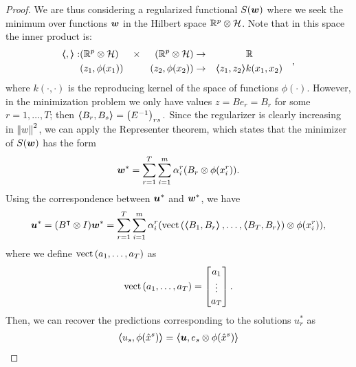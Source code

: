 \begin{proof}
    We are thus considering a regularized functional $S(\bm{w})$ where we seek the minimum over functions $\bm{w}$ in the Hilbert space $\mathbb{R}^p \otimes \mathcal{H}$. Note that in this space the inner product is:
    \begin{equation}
        \nonumber
        \begin{aligned}
            \bm{\left\langle} ,  \bm{\right\rangle}: & (\mathbb{R}^p \otimes \mathcal{H}) & \times &  & (\mathbb{R}^p \otimes \mathcal{H}) & \to &                 & \mathbb{R}      & \\
                       & (z_1, \phi(x_1))                 &        &  & (z_2, \phi(x_2))                 & \to & \bm{\left\langle} z_1, z_2 \bm{\right\rangle} & k(x_1, x_2) &
        \end{aligned},
    \end{equation}
    where $k(\cdot, \cdot)$ is the reproducing kernel of the space of functions $\phi(\cdot)$.
    However, in the minimization problem we only have values $z = B e_r = B_r$ for some $r=1, \ldots, T$; then $\bm{\left\langle} B_r, B_s \bm{\right\rangle} = \left(E^{-1}\right)_{rs}.$
    Since the regularizer is clearly increasing in $\left\lVert w\right\rVert^2$, we can apply the Representer theorem, which states that the minimizer of $S(\bm{w})$ has the form
    \begin{equation}
        \nonumber
        {\bm{w}}^* = \sum_{r=1}^T \sum_{i=1}^m \alpha_i^r (B_r \otimes \phi(x_i^r)) .
    \end{equation}
    Using the correspondence between ${\bm{u}}^*$ and ${\bm{w}}^*$, we have
    \begin{equation}
        \nonumber
        {\bm{u}}^* = (B^\intercal \otimes I) {\bm{w}}^* =  \sum_{r=1}^T \sum_{i=1}^m \alpha_i^r (\bm{\text{vect}}\left(\bm{\left\langle} B_1, B_r \bm{\right\rangle}, \ldots, \bm{\left\langle} B_T, B_r \bm{\right\rangle}\right) \otimes \phi(x_i^r)),
    \end{equation}
    where we define $\bm{\text{vect}}\left(a_1, \ldots, a_T\right)$ as
    $$ \bm{\text{vect}}\left(a_1, \ldots, a_T\right) = 
        \begin{bmatrix}
            a_1 \\
            \vdots \\
            a_T \\
        \end{bmatrix}.
    $$
    Then, we can recover the predictions corresponding to the solutions $u_r^*$ as
    \begin{equation}
        \nonumber
        \begin{aligned}
            \dotp{u_s}{\phi(\hat{x}^s)} & = \dotp{\myvec{u}}{e_s \otimes \phi(\hat{x}^s)}                                                                                                                      \\

\end{aligned}
\end{equation}
\end{proof}
